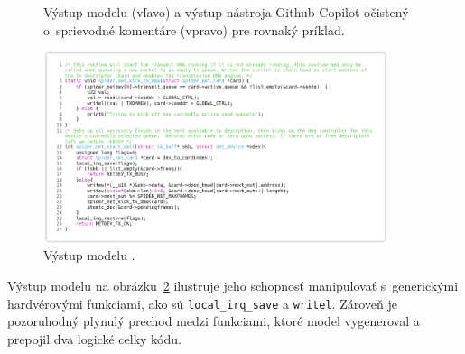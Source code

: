 \begin{figure}
    \centering
    \caption{Výstup modelu \MC{} (vľavo) a výstup nástroja Github Copilot očistený o~sprievodné komentáre (vpravo) pre rovnaký príklad.}
    \label{code:MicroCoder_1}
\end{figure}

\begin{figure}[H]
    \centering
    \includegraphics[width=0.9\textwidth]{obrazky/mc69.png}
    \caption{Výstup modelu \MC.}
    \label{code:MicroCoder_2}
\end{figure}

Výstup modelu na obrázku~\ref{code:MicroCoder_2} ilustruje jeho schopnosť manipulovať s~generickými hardvérovými funkciami, ako sú \texttt{local\_irq\_save} a \texttt{writel}. Zároveň je pozoruhodný plynulý prechod medzi funkciami, ktoré model vygeneroval a prepojil dva logické celky kódu.

